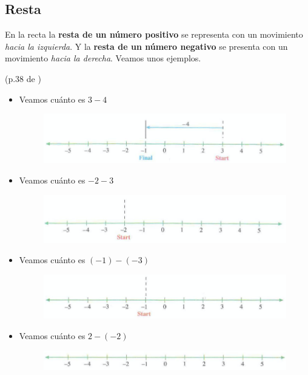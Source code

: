 \subsection{Resta}\label{subsubsubsection_resta_numeros_reales}
En la recta la \textbf{resta de un número positivo} se representa con un movimiento \textit{hacia la izquierda}. Y la \textbf{resta de un número negativo} se presenta con un movimiento \textit{hacia la derecha}. Veamos unos ejemplos.

\begin{ejemplo}
(p.38 de \cite{Dimensions_Math_7A})
	\begin{itemize}
		\item Veamos cuánto es $3-4$
				\begin{figure}[H]
					\centering
					\includegraphics[width=0.7\linewidth]{Algebra/imgs/DM7A_p38_1a}
					\label{DM7A_p38_1a}
				\end{figure}
		\item Veamos cuánto es $-2-3$
				\begin{figure}[H]
					\centering
					\includegraphics[width=0.7\linewidth]{Algebra/imgs/DM7A_p38_1b}
					\label{DM7A_p38_1b}
				\end{figure}
		\item Veamos cuánto es $(-1)-(-3)$
				\begin{figure}[H]
					\centering
					\includegraphics[width=0.7\linewidth]{Algebra/imgs/DM7A_p38_2a}
					\label{DM7A_p38_2a}
				\end{figure}
		\item Veamos cuánto es $2-(-2)$		
				\begin{figure}[H]
					\centering
					\includegraphics[width=0.7\linewidth]{Algebra/imgs/DM7A_p38_2b}

\end{figure}
\end{itemize}
\end{ejemplo}
